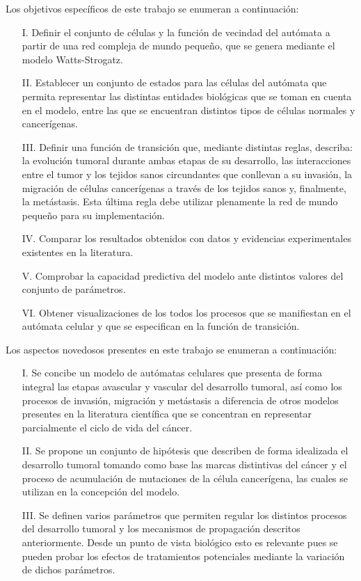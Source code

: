 Los objetivos espec\'ificos de este trabajo se enumeran a continuaci\'on:

\begin{itemize}
\item [I.] Definir el conjunto de c\'elulas y la funci\'on de vecindad del aut\'omata a partir de una red compleja de mundo peque\~no, que se genera mediante el modelo Watts-Strogatz.
\item [II.] Establecer un conjunto de estados para las c\'elulas del aut\'omata que permita representar las distintas entidades biol\'ogicas que se toman en cuenta en el modelo, entre las que se encuentran distintos tipos de c\'elulas normales y cancer\'igenas.
\item [III.] Definir una funci\'on de transici\'on que, mediante distintas reglas, describa: la evoluci\'on tumoral durante ambas etapas de su desarrollo, las interacciones entre el tumor y los tejidos sanos circundantes que conllevan a su invasi\'on, la migraci\'on de c\'elulas cancer\'igenas a trav\'es de los tejidos sanos y, finalmente, la met\'astasis. Esta \'ultima regla debe utilizar plenamente la red de mundo peque\~no para su implementaci\'on.
\item [IV.] Comparar los resultados obtenidos con datos y evidencias experimentales existentes en la literatura.
\item [V.] Comprobar la capacidad predictiva del modelo ante distintos valores del conjunto de par\'ametros.
\item [VI.] Obtener visualizaciones de los todos los procesos que se manifiestan en el aut\'omata celular y que se especifican en la funci\'on de transici\'on.
\end{itemize}

Los aspectos novedosos presentes en este trabajo se enumeran a continuaci\'on:

\begin{itemize}
\item [I.] Se concibe un modelo de aut\'omatas celulares que presenta de forma integral las etapas avascular y vascular del desarrollo tumoral, as\'i como los procesos de invasi\'on, migraci\'on y met\'astasis a diferencia de otros modelos presentes en la literatura cient\'ifica que se concentran en representar parcialmente el ciclo de vida del c\'ancer. 
\item [II.] Se propone un conjunto de hip\'otesis que describen de forma idealizada el desarrollo tumoral tomando como base las marcas distintivas del c\'ancer y el proceso de acumulaci\'on de mutaciones de la c\'elula cancer\'igena, las cuales se utilizan en la concepci\'on del modelo. 
\item [III.] Se definen varios par\'ametros que permiten regular los distintos procesos del desarrollo tumoral y los mecanismos de propagaci\'on descritos anteriormente. Desde un punto de vista biol\'ogico esto es relevante pues se pueden probar los efectos de tratamientos potenciales mediante la variaci\'on de dichos par\'ametros.
\end{itemize}